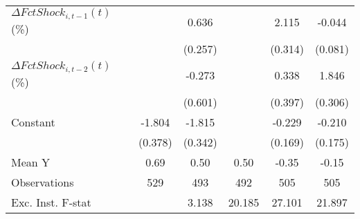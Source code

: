 {\begin{tabular}{l*{5}{c}}
\addlinespace
$ \Delta FctShock_{i,t-1}(t)$ (\%)&                     &       0.636\sym{**} &                     &       2.115\sym{***}&      -0.044         \\
                    &                     &     (0.257)         &                     &     (0.314)         &     (0.081)         \\
\addlinespace
$ \Delta FctShock_{i,t-2}(t)$ (\%)&                     &      -0.273         &                     &       0.338         &       1.846\sym{***}\\
                    &                     &     (0.601)         &                     &     (0.397)         &     (0.306)         \\
\addlinespace
Constant            &      -1.804\sym{***}&      -1.815\sym{***}&                     &      -0.229         &      -0.210         \\
                    &     (0.378)         &     (0.342)         &                     &     (0.169)         &     (0.175)         \\
\midrule
Mean Y              &        0.69         &        0.50         &        0.50         &       -0.35         &       -0.15         \\
Observations        &         529         &         493         &         492         &         505         &         505         \\
Exc. Inst. F-stat   &                     &       3.138         &      20.185         &      27.101         &      21.897         \\
\bottomrule
\end{tabular}
}
